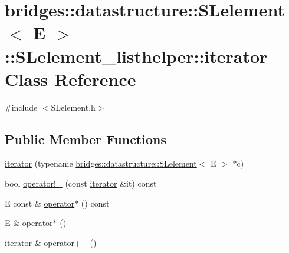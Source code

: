 \hypertarget{classbridges_1_1datastructure_1_1_s_lelement_1_1_s_lelement__listhelper_1_1iterator}{}\section{bridges\+:\+:datastructure\+:\+:S\+Lelement$<$ E $>$\+:\+:S\+Lelement\+\_\+listhelper\+:\+:iterator Class Reference}
\label{classbridges_1_1datastructure_1_1_s_lelement_1_1_s_lelement__listhelper_1_1iterator}


{\ttfamily \#include $<$S\+Lelement.\+h$>$}

\subsection*{Public Member Functions}
\begin{DoxyCompactItemize}
\item 
\hyperlink{classbridges_1_1datastructure_1_1_s_lelement_1_1_s_lelement__listhelper_1_1iterator_a1144192d651fcb5b12eb8cb33dc8d554}{iterator} (typename \hyperlink{classbridges_1_1datastructure_1_1_s_lelement}{bridges\+::datastructure\+::\+S\+Lelement}$<$ E $>$ $\ast$c)
\item 
bool \hyperlink{classbridges_1_1datastructure_1_1_s_lelement_1_1_s_lelement__listhelper_1_1iterator_a2bfd8ffd134a55488f27d1263d3c95a4}{operator!=} (const \hyperlink{classbridges_1_1datastructure_1_1_s_lelement_1_1_s_lelement__listhelper_1_1iterator}{iterator} \&it) const
\item 
E const  \& \hyperlink{classbridges_1_1datastructure_1_1_s_lelement_1_1_s_lelement__listhelper_1_1iterator_a2212bbad66903bdc0051ebeb21119ea2}{operator$\ast$} () const
\item 
E \& \hyperlink{classbridges_1_1datastructure_1_1_s_lelement_1_1_s_lelement__listhelper_1_1iterator_af38cfaf00efb8cc5e7ba0d2328e9e081}{operator$\ast$} ()
\item 
\hyperlink{classbridges_1_1datastructure_1_1_s_lelement_1_1_s_lelement__listhelper_1_1iterator}{iterator} \& \hyperlink{classbridges_1_1datastructure_1_1_s_lelement_1_1_s_lelement__listhelper_1_1iterator_ab5847041e6e49fa6bcfd5efe6d2a1e1a}{operator++} ()
\end{DoxyCompactItemize}


